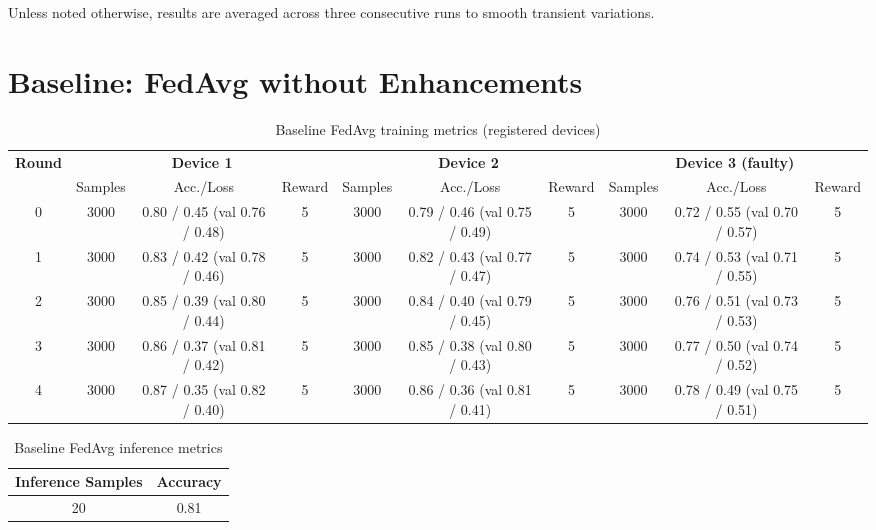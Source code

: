 Unless noted otherwise, results are averaged across three consecutive runs to smooth transient variations.

\section{Baseline: FedAvg without Enhancements}

\begin{table}[h!]
    \centering
    \caption{Baseline FedAvg training metrics (registered devices)}
    \label{tab:baseline_fedavg}
    \begin{tabular}{c|ccc|ccc|ccc}
        \toprule
        \multirow{2}{*}{\textbf{Round}} & \multicolumn{3}{c|}{\textbf{Device 1}} & \multicolumn{3}{c|}{\textbf{Device 2}} & \multicolumn{3}{c}{\textbf{Device 3 (faulty)}} \\
        & Samples & Acc./Loss & Reward & Samples & Acc./Loss & Reward & Samples & Acc./Loss & Reward \\
        \midrule
        0 & 3000 & 0.80 / 0.45 (val 0.76 / 0.48) & 5 & 3000 & 0.79 / 0.46 (val 0.75 / 0.49) & 5 & 3000 & 0.72 / 0.55 (val 0.70 / 0.57) & 5 \\
        1 & 3000 & 0.83 / 0.42 (val 0.78 / 0.46) & 5 & 3000 & 0.82 / 0.43 (val 0.77 / 0.47) & 5 & 3000 & 0.74 / 0.53 (val 0.71 / 0.55) & 5 \\
        2 & 3000 & 0.85 / 0.39 (val 0.80 / 0.44) & 5 & 3000 & 0.84 / 0.40 (val 0.79 / 0.45) & 5 & 3000 & 0.76 / 0.51 (val 0.73 / 0.53) & 5 \\
        3 & 3000 & 0.86 / 0.37 (val 0.81 / 0.42) & 5 & 3000 & 0.85 / 0.38 (val 0.80 / 0.43) & 5 & 3000 & 0.77 / 0.50 (val 0.74 / 0.52) & 5 \\
        4 & 3000 & 0.87 / 0.35 (val 0.82 / 0.40) & 5 & 3000 & 0.86 / 0.36 (val 0.81 / 0.41) & 5 & 3000 & 0.78 / 0.49 (val 0.75 / 0.51) & 5 \\
        \bottomrule
    \end{tabular}
\end{table}

\begin{table}[h!]
    \centering
    \caption{Baseline FedAvg inference metrics}
    \label{tab:baseline_inference}
    \begin{tabular}{c c}
        \toprule
        \textbf{Inference Samples} & \textbf{Accuracy} \\
        \midrule
        20 & 0.81 \\
        \bottomrule
    \end{tabular}
\end{table}


